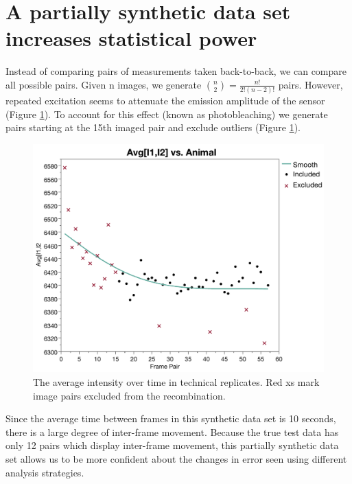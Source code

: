 \section{A partially synthetic data set increases statistical power}

Instead of comparing pairs of measurements taken back-to-back, we can compare all possible pairs. Given n images, we generate ${n \choose 2} = \frac{n!}{2!(n-2)!}$ pairs. However, repeated excitation seems to attenuate the emission amplitude of the sensor (Figure \ref{fig:AvgIntensityOverTime}). To account for this effect (known as photobleaching) we generate pairs starting at the 15th imaged pair and exclude outliers (Figure \ref{fig:AvgIntensityOverTime}).

\begin{figure}[ht]
    \centering
    \includegraphics[scale=0.35]{Figures/rendered_files/photobleaching}
    \decoRule
    \caption[Average intensity over time in technical replicates]{The average intensity over time in technical replicates. Red xs mark image pairs excluded from the recombination.}
    \label{fig:AvgIntensityOverTime}
\end{figure}

Since the average time between frames in this synthetic data set is 10 seconds, there is a large degree of inter-frame movement. Because the true test data has only 12  pairs which display inter-frame movement, this partially synthetic data set allows us to be more confident about the changes in error seen using different analysis strategies.


